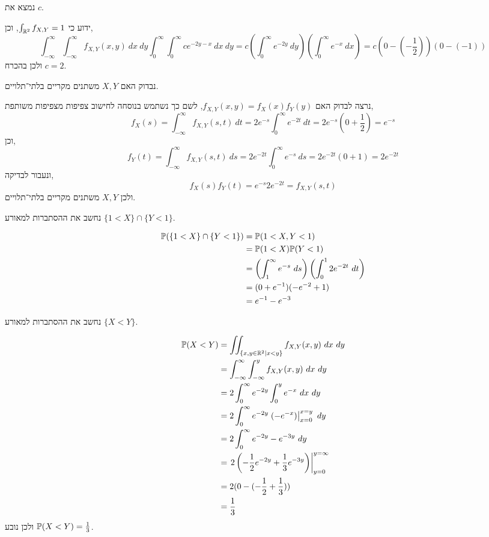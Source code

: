\subquestion{}
נמצא את $c$.
\begin{solution}
	ידוע כי $\int_{\mathbb{R}^2} f_{X, Y} = 1$, וכן,
	\[
		\int_{-\infty}^{\infty} \int_{-\infty}^{\infty} f_{X, Y}(x, y) \ dx\ dy
		\int_{0}^{\infty} \int_{0}^{\infty} c e^{-2y - x} \ dx\ dy
		= c \left( \int_{0}^{\infty} e^{-2y} \ dy \right) \left( \int_{0}^{\infty} e^{-x} \ dx \right)
		= c (0 - (-\frac{1}{2})) (0 - (-1))
	\]
	ולכן בהכרח $c = 2$.
\end{solution}

\subquestion{}
נבדוק האם $X, Y$ משתנים מקריים בלתי־תלויים.
\begin{solution}
	נרצה לבדוק האם $f_{X, Y}(x, y) = f_X(x) f_Y(y)$,
	לשם כך נשתמש בנוסחה לחישוב צפיפות מצפיפות משותפת,
	\[
		f_X(s)
		= \int_{-\infty}^{\infty} f_{X, Y}(s, t) \ dt
		= 2 e^{-s} \int_{0}^{\infty} e^{-2t} \ dt
		= 2 e^{-s} \left( 0 + \frac{1}{2} \right) 
		= e^{-s}
	\]
	וכן,
	\[
		f_Y(t)
		= \int_{-\infty}^{\infty} f_{X, Y}(s, t) \ ds
		= 2 e^{-2t} \int_{0}^{\infty} e^{-s} \ ds
		= 2 e^{-2t} \left( 0 + 1 \right)
		= 2 e^{-2t}
	\]
	ונעבור לבדיקה,
	\[
		f_X(s) f_Y(t)
		= e^{-s} 2 e^{-2t}
		= f_{X, Y}(s, t)
	\]
	ולכן $X, Y$ משתנים מקריים בלתי־תלויים.
\end{solution}

\subquestion{}
נחשב את ההסתברות למאורע $\{1 < X\} \cap \{Y < 1\}$.
\begin{solution}
	\begin{align*}
		\mathbb{P}(\{1 < X\} \cap \{Y < 1\})
		& = \mathbb{P}(1 < X, Y < 1) \\
		& = \mathbb{P}(1 < X) \mathbb{P}(Y < 1) \\
		& = \left( \int_{1}^{\infty} e^{-s} \ ds \right) \left( \int_{0}^{1} 2 e^{-2t} \ dt \right) \\
		& = (0 + e^{-1}) (-e^{-2} + 1) \\
		& = e^{-1} - e^{-3}
	\end{align*}
\end{solution}

\subquestion{}
נחשב את ההסתברות למאורע $\{X < Y\}$.
\begin{solution}
	\begin{align*}
		\mathbb{P}(X < Y)
		& = \iint_{\{ x, y \in \mathbb{R}^2 \mid x < y \}} f_{X, Y}(x, y)\ dx\ dy \\
		& = \int_{-\infty}^{\infty} \int_{-\infty}^{y} f_{X, Y}(x, y)\ dx\ dy \\
		& = 2 \int_0^{\infty} e^{-2y} \int_0^{y} e^{-x}\ dx\ dy \\
		& = 2 \int_0^{\infty} e^{-2y} \left. (-e^{-x}) \right\rvert_{x = 0}^{x = y}\ dy \\
		& = 2 \int_0^{\infty} e^{-2y} - e^{-3y}\ dy \\
		& = \left. 2 \left(-\frac{1}{2} e^{-2y} + \frac{1}{3} e^{-3y} \right) \right\rvert_{y = 0}^{y = \infty} \\
		& = 2 (0 - (-\frac{1}{2} + \frac{1}{3})) \\
		& = \frac{1}{3}
	\end{align*}
	ולכן נובע $\mathbb{P}(X < Y) = \frac{1}{3}$.
\end{solution}


